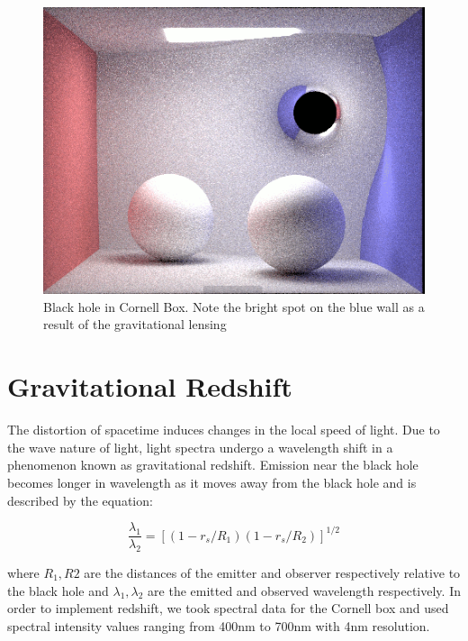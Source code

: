 \documentclass[sigconf]{acmart}
\begin{document}
\begin{figure}[h]
  \centering
  \includegraphics[width=\linewidth]{lense.png}
  \caption{Black hole in Cornell Box. Note the bright spot on the blue wall as a result of the gravitational lensing}
\end{figure}

\section{Gravitational Redshift}

The distortion of spacetime induces changes in the local speed of light. Due to the wave nature of light, light spectra undergo a wavelength shift in a phenomenon known as gravitational redshift. Emission near the black hole becomes longer in wavelength as it moves away from the black hole and is described by the equation\cite{wikipedia_2019}:

\begin{displaymath}
  \frac{\lambda_1}{\lambda_2} = [(1 - r_s / R_1)(1 - r_s/R_2)]^{1/2}
\end{displaymath}

where $R_1, R2$ are the distances of the emitter and observer respectively relative to the black hole and $\lambda_1, \lambda_2$ are the emitted and observed wavelength respectively. In order to implement redshift, we took spectral data for the Cornell box and used spectral intensity values ranging from 400nm to 700nm with 4nm resolution\cite{cornell}.
\end{document}
